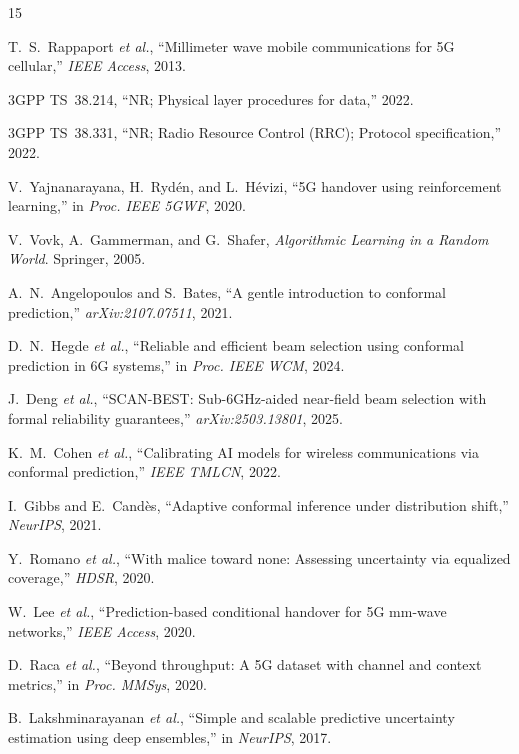 \documentclass[conference]{IEEEtran}
\begin{document}

\begin{thebibliography}{15}

T.~S.~Rappaport \emph{et al.}, ``Millimeter wave mobile communications for 5G cellular,'' \emph{IEEE Access}, 2013.

3GPP TS~38.214, ``NR; Physical layer procedures for data,'' 2022.

3GPP TS~38.331, ``NR; Radio Resource Control (RRC); Protocol specification,'' 2022.

V.~Yajnanarayana, H.~Ryd\'{e}n, and L.~H\'{e}vizi, ``5G handover using reinforcement learning,'' in \emph{Proc. IEEE 5GWF}, 2020.

V.~Vovk, A.~Gammerman, and G.~Shafer, \emph{Algorithmic Learning in a Random World}. Springer, 2005.

A.~N.~Angelopoulos and S.~Bates, ``A gentle introduction to conformal prediction,'' \emph{arXiv:2107.07511}, 2021.

D.~N.~Hegde \emph{et al.}, ``Reliable and efficient beam selection using conformal prediction in 6G systems,'' in \emph{Proc. IEEE WCM}, 2024.

J.~Deng \emph{et al.}, ``SCAN-BEST: Sub-6GHz-aided near-field beam selection with formal reliability guarantees,'' \emph{arXiv:2503.13801}, 2025.

K.~M.~Cohen \emph{et al.}, ``Calibrating AI models for wireless communications via conformal prediction,'' \emph{IEEE TMLCN}, 2022.

I.~Gibbs and E.~Cand\`{e}s, ``Adaptive conformal inference under distribution shift,'' \emph{NeurIPS}, 2021.

Y.~Romano \emph{et al.}, ``With malice toward none: Assessing uncertainty via equalized coverage,'' \emph{HDSR}, 2020.

W.~Lee \emph{et al.}, ``Prediction-based conditional handover for 5G mm-wave networks,'' \emph{IEEE Access}, 2020.

D.~Raca \emph{et al.}, ``Beyond throughput: A 5G dataset with channel and context metrics,'' in \emph{Proc. MMSys}, 2020.

B.~Lakshminarayanan \emph{et al.}, ``Simple and scalable predictive uncertainty estimation using deep ensembles,'' in \emph{NeurIPS}, 2017.

\end{thebibliography}
\end{document}
